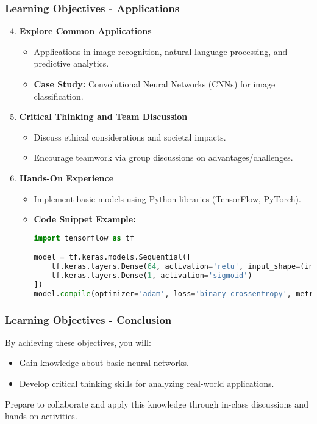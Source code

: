 \documentclass[aspectratio=169]{beamer}
\begin{document}
\begin{frame}[fragile]
    \frametitle{Learning Objectives - Applications}
    \begin{enumerate}
        \setcounter{enumi}{3}
        \item \textbf{Explore Common Applications}
            \begin{itemize}
                \item Applications in image recognition, natural language processing, and predictive analytics.
                \item \textbf{Case Study:} Convolutional Neural Networks (CNNs) for image classification.
            \end{itemize}
        \item \textbf{Critical Thinking and Team Discussion}
            \begin{itemize}
                \item Discuss ethical considerations and societal impacts.
                \item Encourage teamwork via group discussions on advantages/challenges.
            \end{itemize}
        \item \textbf{Hands-On Experience}
            \begin{itemize}
                \item Implement basic models using Python libraries (TensorFlow, PyTorch).
                \item \textbf{Code Snippet Example:}
                \begin{lstlisting}[language=Python]
import tensorflow as tf

model = tf.keras.models.Sequential([
    tf.keras.layers.Dense(64, activation='relu', input_shape=(input_size,)),
    tf.keras.layers.Dense(1, activation='sigmoid')
])
model.compile(optimizer='adam', loss='binary_crossentropy', metrics=['accuracy'])
                \end{lstlisting}
            \end{itemize}
    \end{enumerate}
\end{frame}

\begin{frame}[fragile]
    \frametitle{Learning Objectives - Conclusion}
    By achieving these objectives, you will:
    \begin{itemize}
        \item Gain knowledge about basic neural networks.
        \item Develop critical thinking skills for analyzing real-world applications.
    \end{itemize}
    Prepare to collaborate and apply this knowledge through in-class discussions and hands-on activities.
\end{frame}
\end{document}

